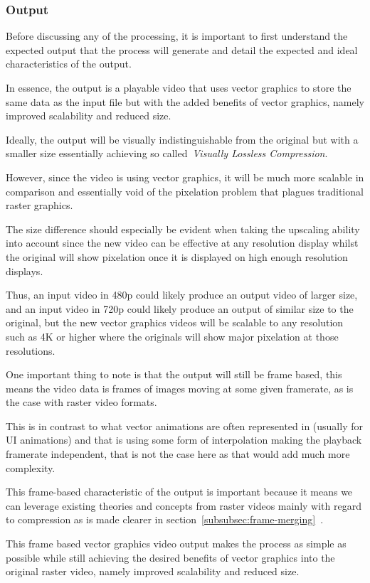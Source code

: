 \documentclass[12pt]{article}
\newcommand{\sentence}{} %
\newcommand{\italic}[1]{\textit{#1}}
\newcommand{\fullref}[1]{\ref{#1}~\nameref{#1}}
\begin{document}
    \subsubsection{Output}\label{subsubsec:output}

    \tab
    Before discussing any of the processing, it is important to first understand the expected output that the process
    will generate and detail the expected and ideal characteristics of the output.
    \sentence
    In essence, the output is a playable video that uses vector graphics to store the same data as the input file but
    with the added benefits of vector graphics, namely improved scalability and reduced size.
    \sentence
    Ideally, the output will be visually indistinguishable from the original but with a smaller size essentially
    achieving so called~\italic{Visually Lossless Compression}.
    \sentence
    However, since the video is using vector graphics, it will be much more scalable in comparison and essentially
    void of the pixelation problem that plagues traditional raster graphics.
    \sentence
    The size difference should especially be evident when taking the upscaling ability into account since the new
    video can be effective at any resolution display whilst the original will show pixelation once it is displayed on
    high enough resolution displays.
    \sentence
    Thus, an input video in 480p could likely produce an output video of larger size, and an input video in 720p
    could likely produce an output of similar size to the original, but the new vector graphics videos will be
    scalable to any resolution such as 4K or higher where the originals will show major pixelation at those resolutions.
    \sentence
    One important thing to note is that the output will still be frame based, this means the video data is frames of
    images moving at some given framerate, as is the case with raster video formats.
    \sentence
    This is in contrast to what vector animations are often represented in (usually for UI animations) and that is
    using some form of interpolation making the playback framerate independent, that is not the case here as that
    would add much more complexity.
    \sentence
    This frame-based characteristic of the output is important because it means we can leverage existing theories and
    concepts from raster videos mainly with regard to compression as is made clearer in
    section~\fullref{subsubsec:frame-merging}.
    \sentence
    This frame based vector graphics video output makes the process as simple as possible while still achieving the
    desired benefits of vector graphics into the original raster video, namely improved scalability and reduced size.
\end{document}
